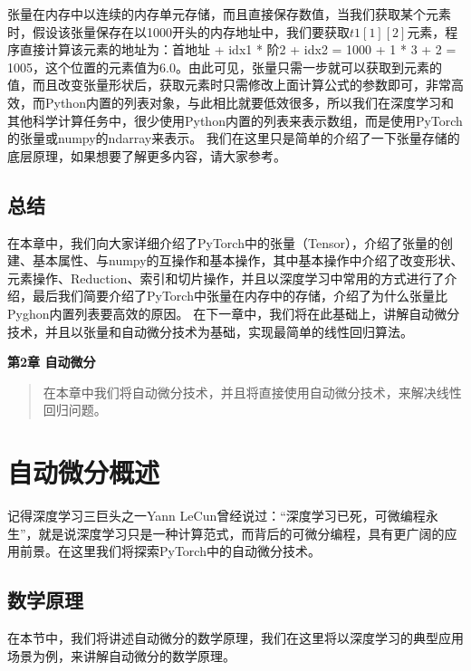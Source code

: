 \documentclass[UTF8]{article}
\begin{document}
张量在内存中以连续的内存单元存储，而且直接保存数值，当我们获取某个元素时，假设该张量保存在以1000开头的内存地址中，我们要获取$t1[1][2]$元素，程序直接计算该元素的地址为：首地址 + idx1 * 阶2 + idx2 = 1000 + 1 * 3 + 2 = 1005，这个位置的元素值为6.0。由此可见，张量只需一步就可以获取到元素的值，而且改变张量形状后，获取元素时只需修改上面计算公式的参数即可，非常高效，而Python内置的列表对象，与此相比就要低效很多，所以我们在深度学习和其他科学计算任务中，很少使用Python内置的列表来表示数组，而是使用PyTorch的张量或numpy的ndarray来表示。\newline
我们在这里只是简单的介绍了一下张量存储的底层原理，如果想要了解更多内容，请大家参考\cite{deep-learning-with-pytorch}。
\subsection{总结}
在本章中，我们向大家详细介绍了PyTorch中的张量（Tensor），介绍了张量的创建、基本属性、与numpy的互操作和基本操作，其中基本操作中介绍了改变形状、元素操作、Reduction、索引和切片操作，并且以深度学习中常用的方式进行了介绍，最后我们简要介绍了PyTorch中张量在内存中的存储，介绍了为什么张量比Pyghon内置列表要高效的原因。\newline
在下一章中，我们将在此基础上，讲解自动微分技术，并且以张量和自动微分技术为基础，实现最简单的线性回归算法。



\newpage
\maketitle
\begin{center}
\Large \textbf{第2章 自动微分} \quad \textbf{}
\end{center}
\begin{abstract}
在本章中我们将自动微分技术，并且将直接使用自动微分技术，来解决线性回归问题。
\end{abstract}
\section{自动微分概述}
记得深度学习三巨头之一Yann LeCun曾经说过：“深度学习已死，可微编程永生”，就是说深度学习只是一种计算范式，而背后的可微分编程，具有更广阔的应用前景。在这里我们将探索PyTorch中的自动微分技术。
\subsection{数学原理}
在本节中，我们将讲述自动微分的数学原理，我们在这里将以深度学习的典型应用场景为例，来讲解自动微分的数学原理。
\end{document}
